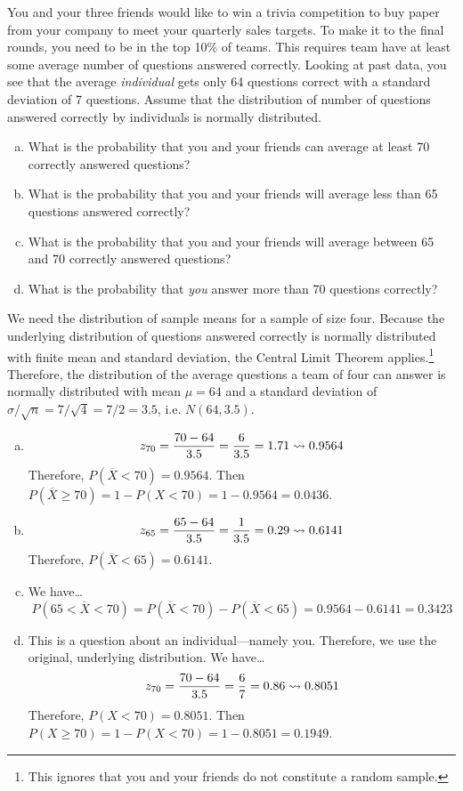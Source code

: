 \documentclass[11pt,letterpaper]{article}
\begin{document}
\newpage



 You and your three friends would like to win a trivia competition to buy paper from your company to meet your quarterly sales targets. To make it to the final rounds, you need to be in the top 10\% of teams. This requires team have at least some average number of questions answered correctly. Looking at past data, you see that the average \textit{individual} gets only 64 questions correct with a standard deviation of 7 questions. Assume that the distribution of number of questions answered correctly by individuals is normally distributed. 
	\begin{enumerate}[(a)]
	\item What is the probability that you and your friends can average at least 70 correctly answered questions?
	\item What is the probability that you and your friends will average less than 65 questions answered correctly?
	\item What is the probability that you and your friends will average between 65 and 70 correctly answered questions?
	\item What is the probability that \textit{you} answer more than 70 questions correctly? 
	\end{enumerate} \pspace

\sol We need the distribution of sample means for a sample of size four. Because the underlying distribution of questions answered correctly is normally distributed with finite mean and standard deviation, the Central Limit Theorem applies.\footnote{This ignores that you and your friends do not constitute a random sample.} Therefore, the distribution of the average questions a team of four can answer is normally distributed with mean $\mu= 64$ and a standard deviation of $\sigma/\sqrt{n}= 7/\sqrt{4}= 7/2= 3.5$, i.e. $N(64, 3.5)$. 

\begin{enumerate}[(a)]
\item 
	\[
	z_{70}= \dfrac{70 - 64}{3.5}= \dfrac{6}{3.5}= 1.71 \rightsquigarrow 0.9564
	\]
Therefore, $P(\overline{X} < 70)= 0.9564$. Then $P(\overline{X} \geq 70)= 1 - P(X < 70)= 1 - 0.9564= 0.0436$. \pspace

\item 
	\[
	z_{65}= \dfrac{65 - 64}{3.5}= \dfrac{1}{3.5}= 0.29 \rightsquigarrow 0.6141
	\]
Therefore, $P(\overline{X} < 65)= 0.6141$. \pspace

\item We have\dots
	\[
	P(65 < \overline{X} < 70)= P(\overline{X} < 70) - P(\overline{X} < 65)= 0.9564 - 0.6141= 0.3423
	\]

\item This is a question about an individual---namely you. Therefore, we use the original, underlying distribution. We have\dots
	\[
	z_{70}= \dfrac{70 - 64}{3.5}= \dfrac{6}{7}= 0.86 \rightsquigarrow 0.8051
	\]
Therefore, $P(X < 70)= 0.8051$. Then $P(X \geq 70)= 1 - P(X < 70)= 1 - 0.8051= 0.1949$. 
\end{enumerate}
\end{document}
